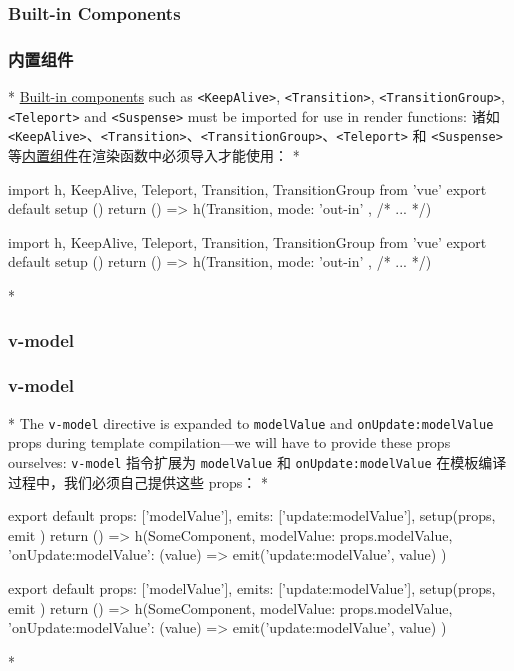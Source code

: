 \begin{paracol}{2}
\subsubsection{Built-in Components}
\switchcolumn
\subsubsection{内置组件}
\switchcolumn[0]*%
\href{https://vuejs.org/api/built-in-components.html}{Built-in
components} such as \texttt{\textless{}KeepAlive\textgreater{}},
\texttt{\textless{}Transition\textgreater{}},
\texttt{\textless{}TransitionGroup\textgreater{}},
\texttt{\textless{}Teleport\textgreater{}} and
\texttt{\textless{}Suspense\textgreater{}} must be imported for use in
render functions:
\switchcolumn
诸如
\texttt{\textless{}KeepAlive\textgreater{}}、\texttt{\textless{}Transition\textgreater{}}、\texttt{\textless{}TransitionGroup\textgreater{}}、\texttt{\textless{}Teleport\textgreater{}}
和 \texttt{\textless{}Suspense\textgreater{}}
等\href{https://cn.vuejs.org/api/built-in-components.html}{内置组件}在渲染函数中必须导入才能使用：
\switchcolumn[0]*%
\begin{codeJs}
import { h, KeepAlive, Teleport, Transition, TransitionGroup } from 'vue'
export default {
  setup () {
    return () => h(Transition, { mode: 'out-in' }, /* ... */)
  }
}
\end{codeJs}
\switchcolumn
\begin{codeJs}
import { h, KeepAlive, Teleport, Transition, TransitionGroup } from 'vue'
export default {
  setup () {
    return () => h(Transition, { mode: 'out-in' }, /* ... */)
  }
}
\end{codeJs}
\switchcolumn[0]*%
\subsubsection{v-model}
\switchcolumn
\subsubsection{v-model}
\switchcolumn[0]*%
The \texttt{v-model} directive is expanded to \texttt{modelValue} and
\texttt{onUpdate:modelValue} props during template compilation---we will
have to provide these props ourselves:
\switchcolumn
\texttt{v-model} 指令扩展为 \texttt{modelValue} 和
\texttt{onUpdate:modelValue} 在模板编译过程中，我们必须自己提供这些
props：
\switchcolumn[0]*%
\begin{codeJs}
export default {
  props: ['modelValue'],
  emits: ['update:modelValue'],
  setup(props, { emit }) {
    return () =>
      h(SomeComponent, {
        modelValue: props.modelValue,
        'onUpdate:modelValue': (value) => emit('update:modelValue', value)
      })
  }
}
\end{codeJs}
\switchcolumn
\begin{codeJs}
export default {
  props: ['modelValue'],
  emits: ['update:modelValue'],
  setup(props, { emit }) {
    return () =>
      h(SomeComponent, {
        modelValue: props.modelValue,
        'onUpdate:modelValue': (value) => emit('update:modelValue', value)
      })
  }
}
\end{codeJs}
\switchcolumn[0]*%

\end{paracol}
